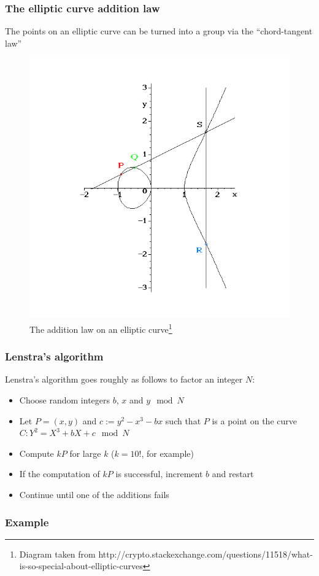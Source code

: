 \documentclass{beamer}
\begin{document}
\begin{frame} %
\frametitle{The elliptic curve addition law}
The points on an elliptic curve can be turned into a group via the ``chord-tangent law''
\begin{figure}[htpb]
	\centering
	\includegraphics[scale=0.25]{addition.png}
	\caption{The addition law on an elliptic curve\footnote{Diagram taken from http://crypto.stackexchange.com/questions/11518/what-is-so-special-about-elliptic-curves}}
\end{figure}
\end{frame}

\begin{frame} %
\frametitle{Lenstra's algorithm}
\begin{definition}
	Lenstra's algorithm goes roughly as follows to factor an integer $N$:
	\begin{itemize}
		\item Choose random integers $b$, $x$ and $y \mod N$
		\item Let $P = (x,y)$ and $c:=y^2-x^3-bx$ such that $P$ is a point on the curve $C: Y^2 = X^3 +bX + c \mod N$
		\item Compute $kP$ for large $k$ ($k=10!$, for example)
		\item If the computation of $kP$ is successful, increment $b$ and restart
		\item Continue until one of the additions fails
	\end{itemize}
\end{definition}
\end{frame}

\begin{frame} %
\frametitle{Example}

\end{frame}
\end{document}
